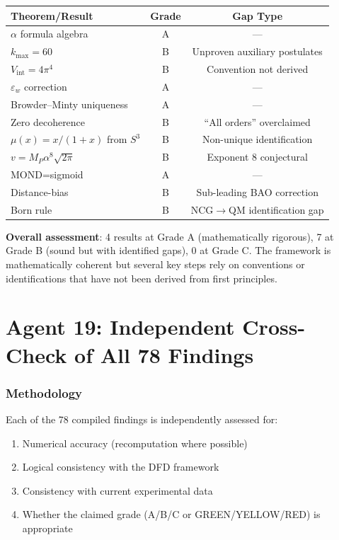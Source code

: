 \documentclass[11pt,a4paper]{article}
\begin{document}
\begin{center}
\begin{tabular}{lcc}
\toprule
\textbf{Theorem/Result} & \textbf{Grade} & \textbf{Gap Type} \\
\midrule
$\alpha$ formula algebra & A & --- \\
$k_{\max} = 60$ & B & Unproven auxiliary postulates \\
$V_{\mathrm{int}} = 4\pi^4$ & B & Convention not derived \\
$\varepsilon_w$ correction & A & --- \\
Browder--Minty uniqueness & A & --- \\
Zero decoherence & B & ``All orders'' overclaimed \\
$\mu(x) = x/(1+x)$ from $S^3$ & B & Non-unique identification \\
$v = M_P\alpha^8\sqrt{2\pi}$ & B & Exponent 8 conjectural \\
MOND=sigmoid & A & --- \\
Distance-bias & B & Sub-leading BAO correction \\
Born rule & B & NCG$\to$QM identification gap \\
\bottomrule
\end{tabular}
\end{center}

\textbf{Overall assessment}: 4 results at Grade A (mathematically rigorous), 7 at Grade B (sound but with identified gaps), 0 at Grade C. The framework is mathematically coherent but several key steps rely on conventions or identifications that have not been derived from first principles.


\part{Agent 19: Independent Cross-Check of All 78 Findings}
\label{part:crosscheck}

\section{Methodology}

Each of the 78 compiled findings is independently assessed for:
\begin{enumerate}
\item Numerical accuracy (recomputation where possible)
\item Logical consistency with the DFD framework
\item Consistency with current experimental data
\item Whether the claimed grade (A/B/C or GREEN/YELLOW/RED) is appropriate
\end{enumerate}
\end{document}
